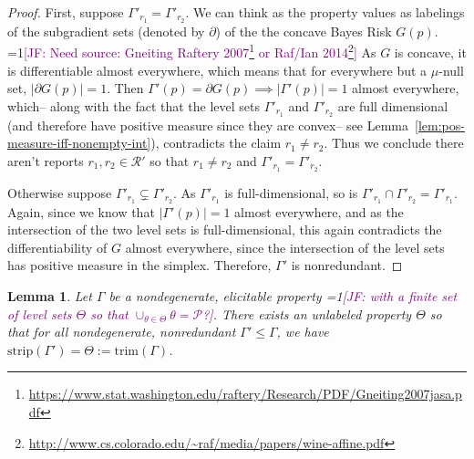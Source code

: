 \documentclass[12pt]{article}
\newcommand{\Comments}{1}
\newcommand{\mynote}[2]{\ifnum\Comments=1\textcolor{#1}{#2}\fi}
\newcommand{\jessie}[1]{\mynote{purple}{[JF: #1]}}
\renewcommand{\P}{\mathcal{P}}
\newcommand{\R}{\mathcal{R}}
\newcommand{\strip}{\mathrm{strip}}
\newtheorem{lemma}{Lemma}
\begin{document}
\begin{proof}
	First, suppose $\Gamma'_{r_1} = \Gamma'_{r_2}$.
	We can think as the property values as labelings of the subgradient sets (denoted by $\partial$) of the the concave Bayes Risk $G(p)$.
	\jessie{Need source: Gneiting Raftery 2007\footnote{\url{https://www.stat.washington.edu/raftery/Research/PDF/Gneiting2007jasa.pdf}} or Raf/Ian 2014\footnote{\url{http://www.cs.colorado.edu/~raf/media/papers/wine-affine.pdf}}}
	As $G$ is concave, it is differentiable almost everywhere, which means that for everywhere but a $\mu$-null set, $|\partial G(p)| = 1$.
	Then $\Gamma'(p) = \partial G(p) \implies |\Gamma'(p)| = 1$ almost everywhere, which-- along with the fact that the level sets $\Gamma'_{r_1}$ and $\Gamma'_{r_2}$ are full dimensional (and therefore have positive measure since they are convex-- see Lemma~\ref{lem:pos-measure-iff-nonempty-int}), contradicts the claim $r_1 \neq r_2$.
	Thus we conclude there aren't reports $r_1, r_2 \in \R'$ so that $r_1 \neq r_2$ and $\Gamma'_{r_1} = \Gamma'_{r_2}$.
	
	
	Otherwise suppose $\Gamma'_{r_1} \subsetneq \Gamma'_{r_2}$.
	As $\Gamma'_{r_1}$ is full-dimensional, so is $\Gamma'_{r_1} \cap \Gamma'_{r_2} = \Gamma'_{r_1}$.
	Again, since we know that $|\Gamma'(p)| = 1$ almost everywhere, and as the intersection of the two level sets is full-dimensional, this again contradicts the differentiability of $G$ almost everywhere, since the intersection of the level sets has positive measure in the simplex.
	Therefore, $\Gamma'$ is nonredundant.

\end{proof}


\begin{lemma}\label{lem:define-trim}
	Let $\Gamma$  be a nondegenerate, elicitable property \jessie{with a finite set of level sets $\Theta$ so that $\cup_{\theta \in \Theta} \theta = \P$?}.
	There exists an unlabeled property $\Theta$ so that for all nondegenerate, nonredundant $\Gamma' \leq \Gamma$, we have $\strip(\Gamma') = \Theta := \text{trim}(\Gamma)$.
\end{lemma}
\end{document}
